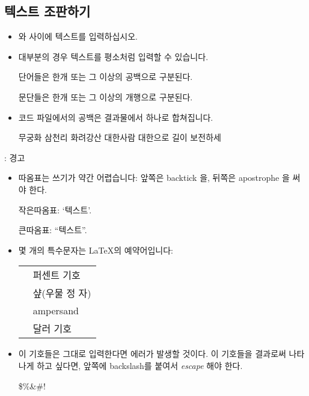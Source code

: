 \documentclass{beamer}
\begin{document}
\subsection{텍스트 조판하기}
\begin{frame}[fragile]{\insertsubsection{}}
\small
\begin{itemize}
\item {} 와  사이에 텍스트를 입력하십시오.
\item 대부분의 경우 텍스트를 평소처럼 입력할 수 있습니다.
\begin{exampletwouptiny}
단어들은 한개 또는 그 이상의 공백으로
구분된다.

문단들은 한개 또는 그 이상의 개행으로
구분된다.
\end{exampletwouptiny}
\item 코드 파일에서의 공백은 결과물에서 하나로 합쳐집니다.
\begin{exampletwouptiny}
무궁화   삼천리   화려강산
대한사람 대한으로 길이 보전하세
\end{exampletwouptiny}
\end{itemize}
\end{frame}

\begin{frame}[fragile]{\insertsubsection{}: 경고}
\small
\begin{itemize}
\item 따옴표는 쓰기가 약간 어렵습니다: 앞쪽은 backtick \keystroke{\`{}}을, 뒤쪽은 apostrophe \keystroke{\'{}} 을 써야 한다.
\begin{exampletwouptiny}
작은따옴표: `텍스트'.

큰따옴표: ``텍스트''.
\end{exampletwouptiny}

\item 몇 개의 특수문자는 \LaTeX 의 예약어입니다:\\[1ex]
\begin{tabular}{cl}
\keystrokebftt{\%} & 퍼센트 기호               \\
\keystrokebftt{\#} & 샾(우물 정 자)            \\
\keystrokebftt{\&} & ampersand                 \\
\keystrokebftt{\$} & 달러 기호                 \\
\end{tabular}
\item 이 기호들은 그대로 입력한다면 에러가 발생할 것이다. 이 기호들을 결과로써
나타나게 하고 싶다면, 앞쪽에 backslash를 붙여서 \emph{escape} 해야 한다.
\begin{exampletwoup}
\$\%\&\#!
\end{exampletwoup}
\end{itemize}
\end{frame}
\end{document}
